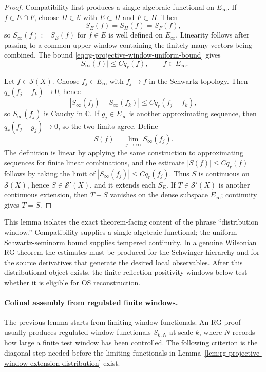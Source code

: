 \begin{proof}
Compatibility first produces a single algebraic functional on
\(E_\infty\).  If \(f\in E\cap F\), choose \(H\in\mathcal E\) with
\(E\subset H\) and \(F\subset H\).  Then
\[
  S_E(f)=S_H(f)=S_F(f),
\]
so \(S_\infty(f):=S_E(f)\) for \(f\in E\) is well defined on
\(E_\infty\).  Linearity follows after passing to a common upper window
containing the finitely many vectors being combined.  The bound
\eqref{eq:rg-projective-window-uniform-bound} gives
\[
  |S_\infty(f)|\leq C q_r(f),
  \qquad f\in E_\infty .
\]

Let \(f\in\mathcal S(X)\).  Choose \(f_j\in E_\infty\) with
\(f_j\to f\) in the Schwartz topology.  Then \(q_r(f_j-f_k)\to0\), hence
\[
  |S_\infty(f_j)-S_\infty(f_k)|
  \leq C q_r(f_j-f_k),
\]
so \(S_\infty(f_j)\) is Cauchy in \(\mathbb C\).  If \(g_j\in E_\infty\)
is another approximating sequence, then \(q_r(f_j-g_j)\to0\), so the two
limits agree.  Define
\[
  S(f)=\lim_{j\to\infty}S_\infty(f_j).
\]
The definition is linear by applying the same construction to approximating
sequences for finite linear combinations, and the estimate
\(|S(f)|\leq Cq_r(f)\) follows by taking the limit of
\(|S_\infty(f_j)|\leq Cq_r(f_j)\).  Thus \(S\) is continuous on
\(\mathcal S(X)\), hence \(S\in\mathcal S'(X)\), and it extends each
\(S_E\).  If \(T\in\mathcal S'(X)\) is another continuous extension, then
\(T-S\) vanishes on the dense subspace \(E_\infty\); continuity gives
\(T=S\).
\end{proof}

This lemma isolates the exact theorem-facing content of the phrase
``distribution window.''  Compatibility supplies a single algebraic
functional; the uniform Schwartz-seminorm bound supplies tempered
continuity.  In a genuine Wilsonian RG theorem the estimates must be produced
for the Schwinger hierarchy and for the source derivatives that generate the
desired local observables.  After this distributional object exists, the
finite reflection-positivity windows below test whether it is eligible for
OS reconstruction.

\paragraph{Cofinal assembly from regulated finite windows.}
The previous lemma starts from limiting window functionals.  An RG proof
usually produces regulated window functionals \(S_{k,N}\) at scale \(k\),
where \(N\) records how large a finite test window has been controlled.  The
following criterion is the diagonal step needed before the limiting
functionals in Lemma~\ref{lem:rg-projective-window-extension-distribution}
exist.

